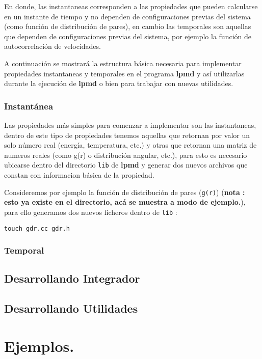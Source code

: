 \documentclass[a4paper,10pt]{scrbook}
\newcommand{\lpmd}{\textbf{lpmd }}
\begin{document}
En donde, las instantaneas corresponden a las propiedades que pueden calcularse en un instante de tiempo y no dependen de configuraciones previas del sistema (como funci\'on de distribuci\'on de pares), en cambio las temporales son aquellas que dependen de configuraciones previas del sistema, por ejemplo la funci\'on de autocorrelaci\'on de velocidades.

A continuaci\'on se mostrar\'a la estructura b\'asica necesaria para implementar propiedades instantaneas y temporales en el programa \lpmd y as\'i utilizarlas durante la ejecuci\'on de \lpmd o bien para trabajar con nuevas utilidades.

\subsection{Instant\'anea}

Las propiedades m\'as simples para comenzar a implementar son las instantaneas, dentro de este tipo de propiedades tenemos aquellas que retornan por valor un solo n\'umero real (energ\'ia, temperatura, etc.) y otras que retornan una matriz de numeros reales (como g(r) o distribuci\'on angular, etc.), para esto es necesario ubicarse dentro del directorio \verb|lib| de \lpmd y generar dos nuevos archivos que constan con informacion b\'asica de la propiedad.

Consideremos por ejemplo la funci\'on de distribuci\'on de pares (\verb|g(r)|) (\textbf{nota : esto ya existe en el directorio, ac\'a se muestra a modo de ejemplo.}), para ello generamos dos nuevos ficheros dentro de \verb|lib| :

\begin{center}
 \verb|touch gdr.cc gdr.h|
\end{center}



\subsection{Temporal}

\section{Desarrollando Integrador}

\section{Desarrollando Utilidades}

\chapter{Ejemplos.}
\label{chap:exa}
\end{document}
